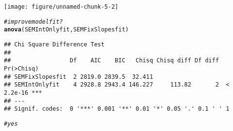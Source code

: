 \documentclass{article}\usepackage[]{graphicx}\usepackage[]{color}
\makeatletter
\def\maxwidth{ %
  \ifdim\Gin@nat@width>\linewidth
    \linewidth
  \else
    \Gin@nat@width
  \fi
}
\newcommand{\hlcom}[1]{\textcolor[rgb]{0.678,0.584,0.686}{\textit{#1}}}%
\newcommand{\hlstd}[1]{\textcolor[rgb]{0.345,0.345,0.345}{#1}}%
\newcommand{\hlkwd}[1]{\textcolor[rgb]{0.737,0.353,0.396}{\textbf{#1}}}%
\newenvironment{kframe}{%
 \def\at@end@of@kframe{}%
 \ifinner\ifhmode%
  \def\at@end@of@kframe{\end{minipage}}%
  \begin{minipage}{\columnwidth}%
 \fi\fi%
 \def\FrameCommand##1{\hskip\@totalleftmargin \hskip-\fboxsep
 \colorbox{shadecolor}{##1}\hskip-\fboxsep
     \hskip-\linewidth \hskip-\@totalleftmargin \hskip\columnwidth}%
 \MakeFramed {\advance\hsize-\width
   \@totalleftmargin\z@ \linewidth\hsize
   \@setminipage}}%
 {\par\unskip\endMakeFramed%
 \at@end@of@kframe}
\newenvironment{knitrout}{}{} %
\makeatother
\begin{document}
\begin{knitrout}
\begin{kframe}
{\ttfamily\noindent\color{warningcolor}{\#\# Warning in qgraph(Edgelist, labels = nLab, bidirectional = Bidir, directed = Directed, : Non-finite weights are omitted}}\end{kframe}
\texttt{[image: figure/unnamed-chunk-5-2]} 
\begin{kframe}\begin{alltt}
\hlcom{# improve model fit?}
\hlkwd{anova}\hlstd{(SEMIntOnlyfit, SEMFixSlopesfit)}
\end{alltt}
\begin{verbatim}
## Chi Square Difference Test
## 
##                 Df    AIC    BIC   Chisq Chisq diff Df diff Pr(>Chisq)    
## SEMFixSlopesfit  2 2819.0 2839.5  32.411                                  
## SEMIntOnlyfit    4 2928.8 2943.4 146.227     113.82       2  < 2.2e-16 ***
## ---
## Signif. codes:  0 '***' 0.001 '**' 0.01 '*' 0.05 '.' 0.1 ' ' 1
\end{verbatim}
\begin{alltt}
\hlcom{# yes}


\end{alltt}
\end{kframe}
\end{knitrout}
\end{document}
